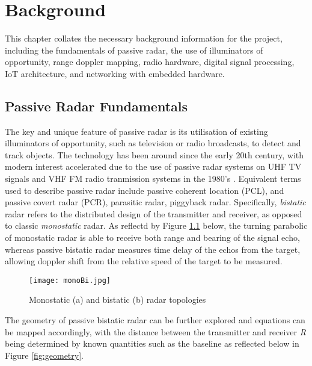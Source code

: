 \chapter{Background \label{sec:background}}

\noindent
This chapter collates the necessary background information for the project, including the fundamentals of passive radar, the use of illuminators of opportunity, range doppler mapping, radio hardware, digital signal processing, IoT architecture, and networking with embedded hardware.


\section{Passive Radar Fundamentals \label{sec:passiveRadarFundamentals}}
The key and unique feature of passive radar is its utilisation of existing illuminators of opportunity, such as television or radio broadcasts, to detect and track objects. The technology has been around since the early 20th century, with modern interest accelerated due to the use of passive radar systems on UHF TV signals and VHF FM radio tranmission systems in the 1980's \cite{FundamentalsPassiveRadar}. Equivalent terms used to describe passive radar include passive coherent location (PCL), and passive covert radar (PCR), parasitic radar, piggyback radar. Specifically, \textit{bistatic} radar refers to the distributed design of the transmitter and receiver, as opposed to classic \textit{monostatic} radar. As reflectd by Figure \ref{fig: topology} below, the turning parabolic of monostatic radar is able to receive both range and bearing of the signal echo, whereas passive bistatic radar measures time delay of the echos from the target, allowing doppler shift from the relative speed of the target to be measured.

\begin{figure}[htbp]
    \centering
    \texttt{[image: monoBi.jpg]}
    \caption{Monostatic (a) and bistatic (b) radar topologies \cite{IOTpassiveRadar}}
    \label{fig: topology}
\end{figure}

\par 
\vspace{0.5cm} 
\noindent The geometry of passive bistatic radar can be further explored and equations can be mapped accordingly, with the distance between the transmitter and receiver \textit{R} being determined by known quantities such as the baseline as reflected below in Figure \ref{fig:geometry}.


